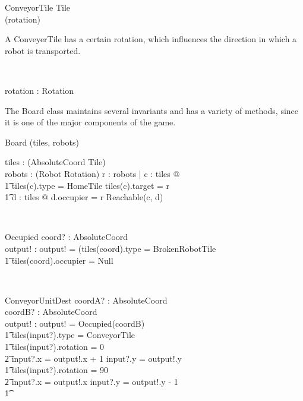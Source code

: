 \documentclass[12pt]{article}
\begin{document}
\begin{class}{ConveyorTile}
Tile \\
\upharpoonright (rotation) \\
\begin{classcom}
A ConveyerTile has a certain rotation, which influences the direction in which a robot is transported.
\end{classcom} \\
\begin{state}
rotation : Rotation
\end{state}
\end{class}

The Board class maintains several invariants and has a variety of methods, since it is one of the major components of the game.

\begin{class}{Board}
\upharpoonright (tiles, robots) \\
\begin{state}
tiles : \power (AbsoluteCoord \fun Tile) \\
robots : \power (Robot \fun Rotation)
\where
\forall r : robots | \exists c : \dom tiles @  \\ \t1 tiles(c).type = HomeTile \wedge tiles(c).target = r \wedge \\ \t1
\exists d : \dom tiles @ d.occupier = r \wedge Reachable(c, d)
\end{state} \\
\begin{schema}{Occupied}
coord? : AbsoluteCoord \\
output! : \bool
\where
output! = (tiles(coord).type = BrokenRobotTile \; \; \vee \\ \t1
tiles(coord).occupier \not = Null
\end{schema} \\
\begin{schema}{ConveyorUnitDest}
coordA? : AbsoluteCoord \\
coordB? : AbsoluteCoord \\
output! : \bool
\where
output! = \neg Occupied(coordB) \\ \t1
        tiles(input?).type = ConveyorTile \\ \t1
        tiles(input?).rotation = 0 \Rightarrow \\ \t2 input?.x = output!.x + 1 \wedge input?.y = output!.y \\ \t1
        tiles(input?).rotation = 90 \Rightarrow \\ \t2 input?.x = output!.x \wedge input?.y = output!.y - 1 \\ \t1

\end{schema}
\end{class}
\end{document}
